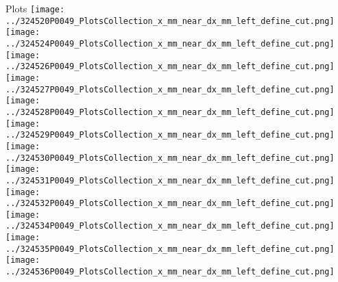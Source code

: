 \documentclass{beamer}
\begin{document}
\begin{frame}
\begin{block}{Plots}
                \texttt{[image: ../324520P0049\_PlotsCollection\_x\_mm\_near\_dx\_mm\_left\_define\_cut.png]}
                \texttt{[image: ../324524P0049\_PlotsCollection\_x\_mm\_near\_dx\_mm\_left\_define\_cut.png]}
                \texttt{[image: ../324526P0049\_PlotsCollection\_x\_mm\_near\_dx\_mm\_left\_define\_cut.png]}
                \texttt{[image: ../324527P0049\_PlotsCollection\_x\_mm\_near\_dx\_mm\_left\_define\_cut.png]}\\
                \texttt{[image: ../324528P0049\_PlotsCollection\_x\_mm\_near\_dx\_mm\_left\_define\_cut.png]}
                \texttt{[image: ../324529P0049\_PlotsCollection\_x\_mm\_near\_dx\_mm\_left\_define\_cut.png]}
                \texttt{[image: ../324530P0049\_PlotsCollection\_x\_mm\_near\_dx\_mm\_left\_define\_cut.png]}
                \texttt{[image: ../324531P0049\_PlotsCollection\_x\_mm\_near\_dx\_mm\_left\_define\_cut.png]}
                \texttt{[image: ../324532P0049\_PlotsCollection\_x\_mm\_near\_dx\_mm\_left\_define\_cut.png]}\\
                \texttt{[image: ../324534P0049\_PlotsCollection\_x\_mm\_near\_dx\_mm\_left\_define\_cut.png]}
                \texttt{[image: ../324535P0049\_PlotsCollection\_x\_mm\_near\_dx\_mm\_left\_define\_cut.png]}
                \texttt{[image: ../324536P0049\_PlotsCollection\_x\_mm\_near\_dx\_mm\_left\_define\_cut.png]}

        \end{block}
\end{frame}
\end{document}
